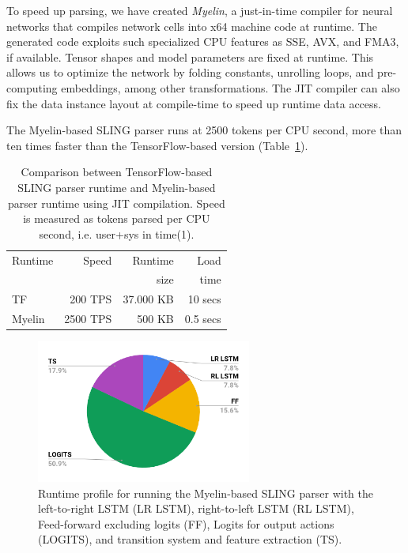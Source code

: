 \documentclass[11pt,a4paper]{article}
\begin{document}
To speed up parsing, we have created \emph{Myelin}, a
just-in-time compiler for neural networks that compiles network cells into
x64 machine code at runtime. The generated code exploits such
specialized CPU features as SSE, AVX, and FMA3, if available.
Tensor shapes and model parameters are fixed at runtime.
This allows us to optimize the network by folding constants, unrolling
loops, and pre-computing embeddings, among other transformations. The JIT compiler can also fix the data
instance layout at compile-time to speed up runtime data access.

The Myelin-based SLING parser runs at 2500 tokens per CPU second, more
than ten times faster than the TensorFlow-based version
(Table~\ref{tab:runtime}).

\begin{table}[!t]
\centering
\begin{tabular}{|l|r|r|r|}
\hline
Runtime    & Speed     & Runtime      & Load      \\
           &           & size         & time      \\
\hline
TF         &  200 TPS  & 37.000 KB    & 10 secs   \\
Myelin     & 2500 TPS  &    500 KB    & 0.5 secs  \\
\hline
\end{tabular}
\caption{Comparison between TensorFlow-based SLING parser runtime and
Myelin-based parser runtime using JIT compilation.
Speed is measured as tokens parsed per CPU second, i.e. user+sys in time(1).}
\label{tab:runtime}
\end{table}

\begin{figure}[t]
  \centering
  \includegraphics[width = 200pt]{runtime.pdf}
  \caption{Runtime profile for running the Myelin-based SLING parser with the
  left-to-right LSTM (LR LSTM), right-to-left LSTM (RL LSTM), Feed-forward
  excluding logits (FF), Logits for output actions (LOGITS), and transition
  system and feature extraction (TS).}
  \label{fig:runtime}
\end{figure}
\end{document}
